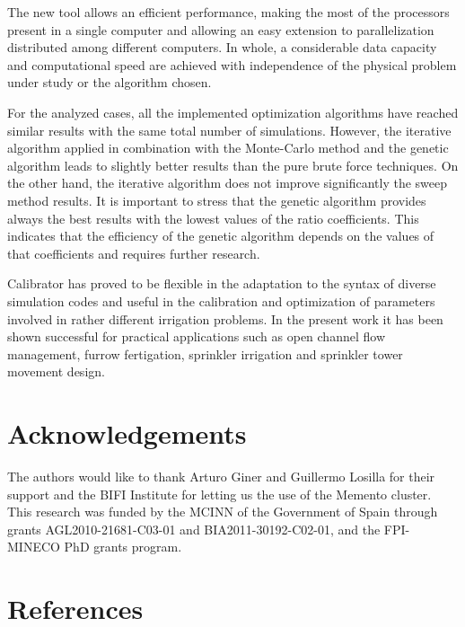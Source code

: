 \documentclass[review,authoryear]{elsarticle}
\begin{document}
The new tool allows an efficient performance, making the most of the processors present in a single computer and allowing an easy extension to parallelization distributed among different computers. In whole, a considerable data capacity and computational speed are achieved with independence of the physical problem under study or the algorithm chosen.

For the analyzed cases, all the implemented optimization algorithms have reached similar results with the same total number of simulations. However, the iterative algorithm applied in combination with the Monte-Carlo method and the genetic algorithm leads to slightly better results than the pure brute force techniques. On the other hand, the iterative algorithm does not improve significantly the sweep method results. It is important to stress that the genetic algorithm provides always the best results with the lowest values of the ratio coefficients. This indicates that the efficiency of the genetic algorithm depends on the values of that coefficients and requires further research. 

Calibrator has proved to be flexible in the adaptation to the syntax of diverse simulation codes and useful in the calibration and optimization of parameters involved in rather different irrigation problems. In the present work it has been shown successful for practical applications such as open channel flow management, furrow fertigation, sprinkler irrigation and sprinkler tower movement design.

\section*{Acknowledgements}

The authors would like to thank Arturo Giner and Guillermo Losilla for their support and the BIFI
Institute for letting us the use of the Memento cluster.
This research was funded by the MCINN of the Government of Spain through grants AGL2010-21681-C03-01 and BIA2011-30192-C02-01, and the FPI-MINECO PhD grants program.

\section*{References}

\end{document}
